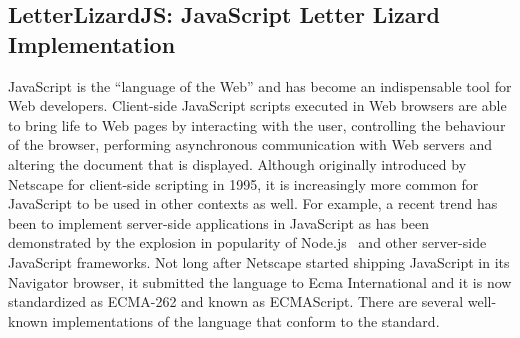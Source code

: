 \FloatBarrier
\subsection{LetterLizardJS: JavaScript Letter Lizard Implementation}
\label{lljs}


JavaScript is the ``language of the Web'' and has become an indispensable 
tool for Web developers. Client-side JavaScript scripts executed in Web
browsers are able to bring life to Web pages by interacting with the user,
controlling the behaviour of the browser, performing asynchronous communication
with Web servers and altering the document that is displayed. Although originally
introduced by Netscape for client-side scripting in 1995, it is increasingly
more common for JavaScript to be used in other contexts as well. For example,
a recent trend has been to implement server-side applications in JavaScript as
has been demonstrated by the explosion in popularity of Node.js~\cite{nodejs} and other
server-side JavaScript frameworks. Not long after Netscape started shipping 
JavaScript in its Navigator browser, it submitted the language to Ecma International
and it is now standardized as ECMA-262 and known as ECMAScript.
There are several well-known implementations of the language that conform to the standard.



